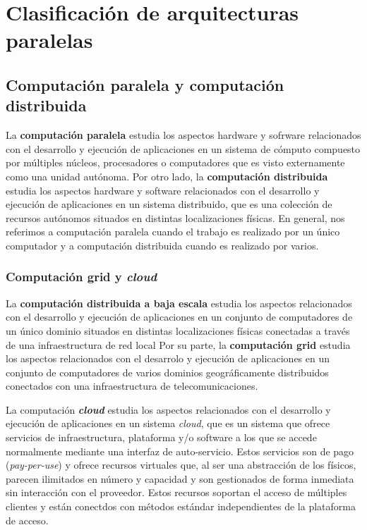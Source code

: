 \section{Clasificación de arquitecturas paralelas}\label{clasificacion-arq-paralelas}

\subsection{Computación paralela y computación distribuida}\label{computacion-par-distribuida}

La \textbf{computación paralela} estudia los aspectos hardware y sofrware relacionados con el desarrollo y ejecución de aplicaciones en un sistema de cómputo compuesto por múltiples núcleos, procesadores o computadores que es visto externamente como una unidad autónoma.
Por otro lado, la \textbf{computación distribuida} estudia los aspectos hardware y software relacionados con el desarrollo y ejecución de aplicaciones en un sistema distribuido, que es una colección de recursos autónomos situados en distintas localizaciones físicas.
En general, nos referimos a computación paralela cuando el trabajo es realizado por un único computador y a computación distribuida cuando es realizado por varios.

\subsubsection{Computación grid y \textit{cloud}}

La \textbf{computación distribuida a baja escala} estudia los aspectos relacionados con el desarrollo y ejecución de aplicaciones en un conjunto de computadores de un único dominio situados en distintas localizaciones físicas conectadas a través de una infraestructura de red local
Por su parte, la \textbf{computación grid} estudia los aspectos relacionados con el desarrolo y ejecución de aplicaciones en un conjunto de computadores de varios dominios geográficamente distribuidos conectados con una infraestructura de telecomunicaciones.

La computación \textbf{\textit{cloud}} estudia los aspectos relacionados con el desarrollo y ejecución de aplicaciones en un sistema \textit{cloud}, que es un sistema que ofrece servicios de infraestructura, plataforma y/o software a los que se accede normalmente mediante una interfaz de auto-servicio.
Estos servicios son de pago (\textit{pay-per-use}) y ofrece recursos virtuales que, al ser una abstracción de los físicos, parecen ilimitados en número y capacidad y son gestionados de forma inmediata sin interacción con el proveedor.
Estos recursos soportan el acceso de múltiples clientes y están conectdos con métodos estándar independientes de la plataforma de acceso.

